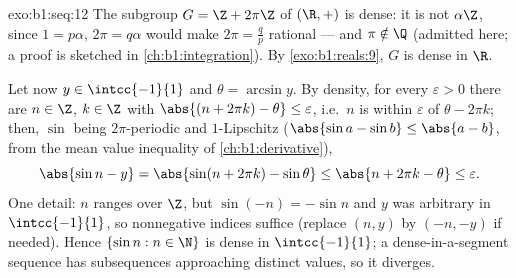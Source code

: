 \begin{solution}{exo:b1:seq:12}
The subgroup $G = \Z + 2\pi\Z$ of $(\R, +)$ is dense: it is not
$\alpha\Z$, since $1 = p\alpha$, $2\pi = q\alpha$ would make $2\pi =
\frac qp$ rational --- and $\pi \notin \Q$ (admitted here; a proof is
sketched in \cref{ch:b1:integration}). By \cref{exo:b1:reals:9}, $G$
is dense in $\R$.

Let now $y \in \intcc{-1}{1}$ and $\theta = \arcsin y$. By density,
for every $\varepsilon > 0$ there are $n \in \Z$, $k \in \Z$ with
$\abs{(n + 2\pi k) - \theta} \leq \varepsilon$, i.e.\ $n$ is within
$\varepsilon$ of $\theta - 2\pi k$; then, $\sin$ being
$2\pi$-periodic and $1$-Lipschitz ($\abs{\sin a - \sin b} \leq
\abs{a - b}$, from the mean value inequality of
\cref{ch:b1:derivative}),
\[
\abs{\sin n - y} = \abs{\sin(n + 2\pi k) - \sin\theta}
\leq \abs{n + 2\pi k - \theta} \leq \varepsilon .
\]
One detail: $n$ ranges over $\Z$, but $\sin(-n) = -\sin n$ and $y$
was arbitrary in $\intcc{-1}{1}$, so nonnegative indices suffice
(replace $(n, y)$ by $(-n, -y)$ if needed). Hence $\{\sin n : n \in
\N\}$ is dense in $\intcc{-1}{1}$; a dense-in-a-segment sequence has
subsequences approaching distinct values, so it diverges.
\end{solution}


